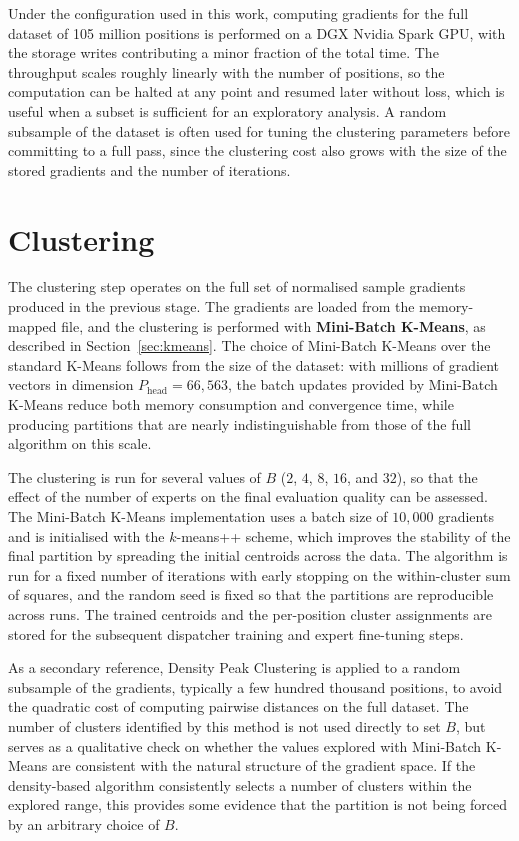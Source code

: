 Under the configuration used in this work, computing gradients for the full dataset of 105 million positions is performed on a DGX Nvidia Spark GPU, with the storage writes contributing a minor fraction of the total time. The throughput scales roughly linearly with the number of positions, so the computation can be halted at any point and resumed later without loss, which is useful when a subset is sufficient for an exploratory analysis. A random subsample of the dataset is often used for tuning the clustering parameters before committing to a full pass, since the clustering cost also grows with the size of the stored gradients and the number of iterations.

\section{Clustering}\label{sec:clustering-impl}

The clustering step operates on the full set of normalised sample gradients produced in the previous stage. The gradients are loaded from the memory-mapped file, and the clustering is performed with \textbf{Mini-Batch K-Means}, as described in Section~\ref{sec:kmeans}. The choice of Mini-Batch K-Means over the standard K-Means follows from the size of the dataset: with millions of gradient vectors in dimension \(P_{\mathrm{head}} = 66{,}563\), the batch updates provided by Mini-Batch K-Means reduce both memory consumption and convergence time, while producing partitions that are nearly indistinguishable from those of the full algorithm on this scale.

The clustering is run for several values of \(B\) (\(2\), \(4\), \(8\), \(16\), and \(32\)), so that the effect of the number of experts on the final evaluation quality can be assessed. The Mini-Batch K-Means implementation uses a batch size of \(10{,}000\) gradients and is initialised with the \(k\)-means++ scheme, which improves the stability of the final partition by spreading the initial centroids across the data. The algorithm is run for a fixed number of iterations with early stopping on the within-cluster sum of squares, and the random seed is fixed so that the partitions are reproducible across runs. The trained centroids and the per-position cluster assignments are stored for the subsequent dispatcher training and expert fine-tuning steps.

As a secondary reference, Density Peak Clustering is applied to a random subsample of the gradients, typically a few hundred thousand positions, to avoid the quadratic cost of computing pairwise distances on the full dataset. The number of clusters identified by this method is not used directly to set \(B\), but serves as a qualitative check on whether the values explored with Mini-Batch K-Means are consistent with the natural structure of the gradient space. If the density-based algorithm consistently selects a number of clusters within the explored range, this provides some evidence that the partition is not being forced by an arbitrary choice of \(B\).

